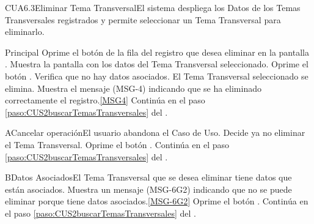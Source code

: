 	\begin{UseCase}{CUA6.3}{Eliminar Tema Transversal}{El sistema despliega los Datos de los Temas Transversales registrados y permite seleccionar un Tema Transversal  para eliminarlo.}
	\end{UseCase}

	\begin{UCtrayectoria}{Principal}
			\UCpaso[\UCactor] Oprime el botón  de la fila del registro que desea eliminar en la pantalla .	
			\UCpaso Muestra la pantalla  con los datos del Tema Transversal seleccionado. 
			\UCpaso [\UCactor] Oprime el botón . 
			\UCpaso Verifica que no hay datos asociados. 
			\UCpaso El Tema Transversal seleccionado se elimina.
			\UCpaso Muestra el mensaje (MSG-4) indicando que se ha eliminado correctamente el registro.\ref{MSG4}
			\UCpaso Continúa en el paso \ref{paso:CUS2buscarTemasTransversales} del .
	\end{UCtrayectoria}

		\begin{UCtrayectoriaA}{A}{Cancelar operación}{El usuario abandona el Caso de Uso.}
			\UCpaso[\UCactor] Decide ya no eliminar el Tema Transversal.
			\UCpaso[\UCactor] Oprime el botón .
			\UCpaso Continúa en el paso \ref{paso:CUS2buscarTemasTransversales} del .
		\end{UCtrayectoriaA}
		
		\begin{UCtrayectoriaA}{B}{Datos Asociados}{El Tema Transversal que se desea eliminar tiene datos que están asociados.}
			\UCpaso Muestra un mensaje (MSG-6G2) indicando que no se puede eliminar porque tiene datos asociados.\ref{MSG-6G2}
			\UCpaso [\UCactor] Oprime el botón .
			\UCpaso Continúa en el paso \ref{paso:CUS2buscarTemasTransversales} del .
		\end{UCtrayectoriaA}
